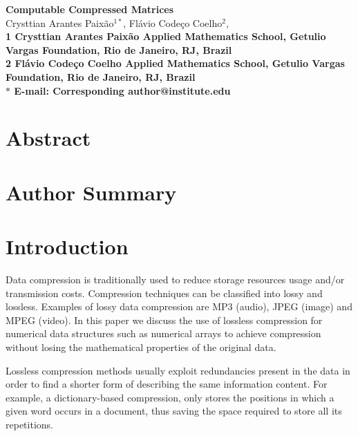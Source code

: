 \documentclass[10pt]{article}
\date{}
\begin{document}
\begin{flushleft}
{\Large
\textbf{Computable Compressed Matrices}
}
\\
Crysttian Arantes Paix\~{a}o$^{1\ast}$, 
Fl\'{a}vio Code\c{c}o Coelho$^{2}$, 
\\
\bf{1} Crysttian Arantes Paix\~{a}o Applied Mathematics School, Getulio Vargas Foundation, Rio de Janeiro, RJ, Brazil
\\
\bf{2} Fl\'{a}vio Code\c{c}o Coelho Applied Mathematics School, Getulio Vargas Foundation, Rio de Janeiro, RJ, Brazil
\\
$\ast$ E-mail: Corresponding author@institute.edu
\end{flushleft}

\section*{Abstract}

\section*{Author Summary}

\section*{Introduction}

Data compression is traditionally used to reduce storage resources usage and/or transmission costs\cite{salomon}. Compression techniques can be classified into lossy and lossless. Examples of lossy data compression are MP3 (audio), JPEG (image) and MPEG (video). In this paper we discuss the use of lossless compression for numerical data structures such as numerical arrays to achieve compression without losing the mathematical properties of the original data.  

Lossless compression methods usually exploit redundancies present in the data in order to find a shorter form of describing the same information content. For example, a dictionary-based compression, only stores the positions in which a given word occurs in a document, thus saving the space required to store all its repetitions\cite{salomon2}. 
\end{document}
